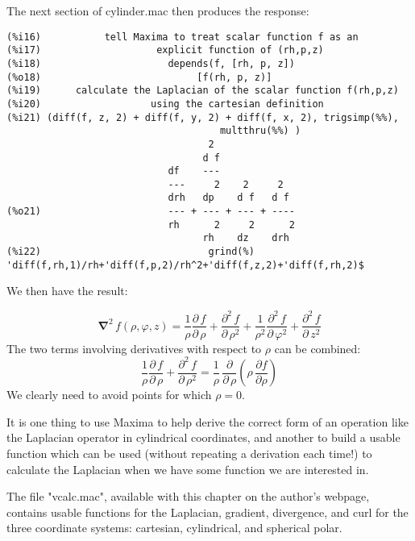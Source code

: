 \documentclass[12pt]{article}
\begin{document}
\newpage

The next section of cylinder.mac then produces the response:  

\small
\begin{verbatim}
(%i16)           tell Maxima to treat scalar function f as an 
(%i17)                    explicit function of (rh,p,z) 
(%i18)                      depends(f, [rh, p, z])
(%o18)                           [f(rh, p, z)]
(%i19)      calculate the Laplacian of the scalar function f(rh,p,z) 
(%i20)                   using the cartesian definition 
(%i21) (diff(f, z, 2) + diff(f, y, 2) + diff(f, x, 2), trigsimp(%%), 
                                     multthru(%%) )
                                   2
                                  d f
                            df    ---
                            ---     2    2     2
                            drh   dp    d f   d f
(%o21)                      --- + --- + --- + ----
                            rh      2     2      2
                                  rh    dz    drh
(%i22)                             grind(%)
'diff(f,rh,1)/rh+'diff(f,p,2)/rh^2+'diff(f,z,2)+'diff(f,rh,2)$
\end{verbatim}
\normalsize
We then have the result:

\begin{equation}
\boldsymbol{\nabla}^2\,f(\rho,\varphi,z) =  \frac{1}{\rho} \frac{\partial \, f}{\partial \, \rho} +
       \frac{\partial^2 \, f}{\partial \, \rho^2} +
	   \frac{1}{\rho^2} \frac{\partial^2 \, f}{\partial \, \varphi^2} +
	   \frac{\partial^2 \, f}{\partial \, z^2}
\end{equation}
The two terms involving derivatives with respect to $\rho$ can be combined:
\begin{equation}
\frac{1}{\rho} \frac{\partial \, f}{\partial \, \rho} + 
\frac{\partial^2 \, f}{\partial \, \rho^2}  =  
\frac{1}{\rho} \, \frac{\partial}{\partial \, \rho} \left( \rho \,\frac{\partial f}{\partial \rho} \right)
\end{equation}
We clearly need to avoid points for which $\rho = 0$.

\smallskip

It is one thing to use Maxima to help derive the correct form of an operation
  like the Laplacian operator in cylindrical coordinates, and another to build
  a usable function which can be used (without repeating a derivation each time!)
  to calculate the Laplacian when we have some function we are interested in.

\smallskip
The file "vcalc.mac", available with this chapter on the author's webpage, contains
  usable functions for the Laplacian, gradient, divergence, and curl for the
  three coordinate systems: cartesian, cylindrical, and spherical polar.
\end{document}
